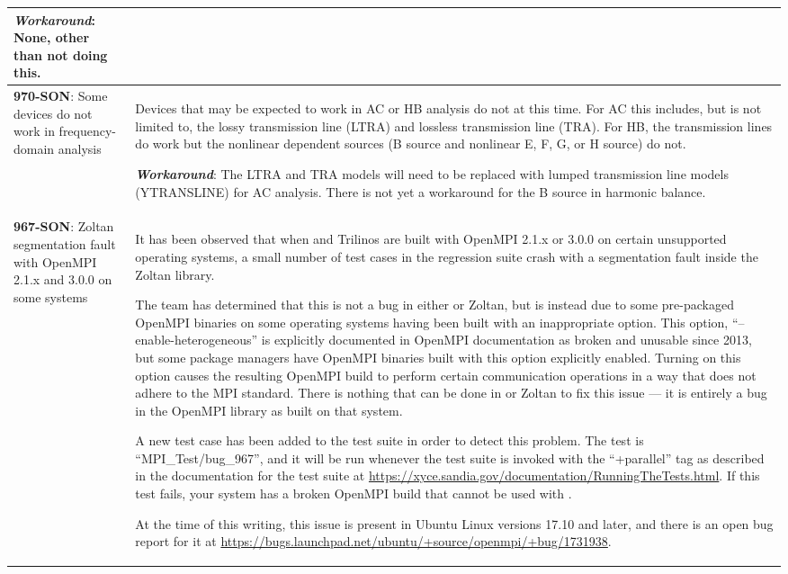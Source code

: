 {\begin{longtable}[h] {>{\raggedright\small}m{2in}|>{\raggedright\let\\\tabularnewline\small}m{3.5in}}
\textbf{\textit{Workaround}}: None, other than not doing this.
\\ \hline

\textbf{970-SON}: Some devices do not work in frequency-domain analysis &
Devices that may be expected to work in AC or HB analysis do not at
this time.  For AC this includes, but is not limited to, the lossy
transmission line (LTRA) and lossless transmission line (TRA).  For
HB, the transmission lines do work but the nonlinear dependent sources
(B source and nonlinear E, F, G, or H source) do not.

\textbf{\textit{Workaround}}: The LTRA and TRA models will need to be replaced
with lumped transmission line models (YTRANSLINE) for AC analysis.
There is not yet a workaround for the B source in harmonic balance.
\\ \hline

\textbf{967-SON}: Zoltan segmentation fault with OpenMPI 2.1.x and 3.0.0 on
some systems &

It has been observed that when \Xyce{} and Trilinos are built with
OpenMPI 2.1.x or 3.0.0 on certain unsupported operating systems, a
small number of test cases in the regression suite crash with a
segmentation fault inside the Zoltan library.

The \Xyce{} team has determined that this is not a bug in
either \Xyce{} or Zoltan, but is instead due to some pre-packaged OpenMPI
binaries on some operating systems having been built with an
inappropriate option.  This option, ``--enable-heterogeneous'' is
explicitly documented in OpenMPI documentation as broken and unusable
since 2013, but some package managers have OpenMPI binaries built with
this option explicitly enabled.  Turning on this option causes the
resulting OpenMPI build to perform certain communication operations in
a way that does not adhere to the MPI standard.  There is nothing that
can be done in \Xyce{} or Zoltan to fix this issue --- it is entirely
a bug in the OpenMPI library as built on that system.

A new test case has been added to the \Xyce{} test suite in order to
detect this problem.  The test is ``MPI\_Test/bug\_967'', and it will
be run whenever the test suite is invoked with the ``+parallel'' tag
as described in the documentation for the test suite
at \url{https://xyce.sandia.gov/documentation/RunningTheTests.html}.
If this test fails, your system has a broken OpenMPI build that cannot
be used with \Xyce{}.

At the time of this writing, this issue is present in Ubuntu Linux
versions 17.10 and later, and there is an open bug report for it
at \url{https://bugs.launchpad.net/ubuntu/+source/openmpi/+bug/1731938}.


\end{longtable}}
